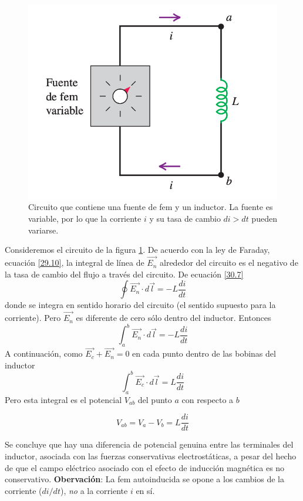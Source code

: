 \begin{figure}[h]\label{fig30.5.circuito}
\centering
\includegraphics[scale=0.4]{fig/circuito}
\caption{Circuito que contiene una fuente de fem y un inductor. La fuente es variable, por lo que la corriente $i$ y su tasa de cambio $di>dt$ pueden variarse.}
\end{figure}

Consideremos el circuito de la figura \ref{fig30.5.circuito}. De acuerdo con la ley de Faraday, ecuación \ref{29.10}, la integral de línea de $\vec{E_n}$ alrededor del circuito es el negativo de la tasa de cambio del flujo a través del circuito. De ecuación \ref{30.7} $$\oint\vec{E_n}\cdot d\vec{l}=-L\frac{di}{dt}$$ donde se integra en sentido horario del circuito (el sentido supuesto para la corriente). Pero $\vec{E_n}$ es diferente de cero sólo dentro del inductor. Entonces $$\int_a^b\vec{E_n}\cdot d\vec{l}=-L\frac{di}{dt}$$ A continuación, como $\vec{E_c}+\vec{E_n}=0$ en cada punto dentro de las bobinas del inductor $$\int_a^b\vec{E_c}\cdot d\vec{l}=L\frac{di}{dt}$$ Pero esta integral es el potencial $V_{ab}$ del punto $a$ con respecto a $b$

\begin{equation}\label{30.8}
V_{ab}=V_a-V_b=L\frac{di}{dt}
\end{equation}

Se concluye que hay una diferencia de potencial genuina entre las terminales del inductor, asociada con las fuerzas conservativas electrostáticas, a pesar del hecho de que el campo eléctrico asociado con el efecto de inducción magnética es no conservativo.
\textbf{Obervación}: La fem autoinducida se opone a los cambios de la corriente ($di/dt$), \textit{no} a la corriente $i$ en sí.

